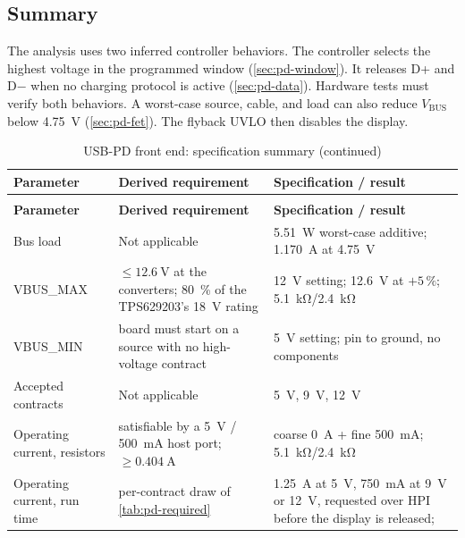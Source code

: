 \subsection{Summary}\label{sec:pd-summary}

The analysis uses two inferred controller behaviors. The controller selects the
highest voltage in the programmed window (\cref{sec:pd-window}). It releases D+
and D$-$ when no charging protocol is active (\cref{sec:pd-data}). Hardware
tests must verify both behaviors. A worst-case source, cable, and load can also
reduce $V_{\mathrm{BUS}}$ below \SI{4.75}{\volt} (\cref{sec:pd-fet}). The
flyback UVLO then disables the display.

{\footnotesize
\begin{longtable}{|p{}|p{}|p{}|}
\caption{USB-PD front end: specification summary}\label{tab:pd-summary}\\
\hline
\textbf{Parameter} & \textbf{Derived requirement} & \textbf{Specification / result} \\
\hline
\endfirsthead
\caption[]{USB-PD front end: specification summary (continued)}\\
\hline
\textbf{Parameter} & \textbf{Derived requirement} & \textbf{Specification / result} \\
\hline
\endhead
\hline
\endlastfoot
Bus load & Not applicable & \SI{5.51}{\watt} worst-case additive;
  \SI{1.170}{\ampere} at \SI{4.75}{\volt} \\
\hline
VBUS\_MAX & $\leq\SI{12.6}{\volt}$ at the converters; \SI{80}{\percent} of the
  TPS629203's \SI{18}{\volt} rating & \SI{12}{\volt} setting; \SI{12.6}{\volt}
  at $+5\,\%$; \SI{5.1}{\kilo\ohm}/\SI{2.4}{\kilo\ohm} \\
\hline
VBUS\_MIN & board must start on a source with no high-voltage contract &
  \SI{5}{\volt} setting; pin to ground, no components \\
\hline
Accepted contracts & Not applicable & \SI{5}{\volt}, \SI{9}{\volt}, \SI{12}{\volt} \\
\hline
Operating current, resistors & satisfiable by a \SI{5}{\volt} /
  \SI{500}{\milli\ampere} host port; $\geq\SI{0.404}{\ampere}$ &
  coarse \SI{0}{\ampere} + fine \SI{500}{\milli\ampere};
  \SI{5.1}{\kilo\ohm}/\SI{2.4}{\kilo\ohm} \\
\hline
Operating current, run time & per-contract draw of \cref{tab:pd-required} &
  \SI{1.25}{\ampere} at \SI{5}{\volt}, \SI{750}{\milli\ampere} at \SI{9}{\volt}
  or \SI{12}{\volt}, requested over HPI before the display is released;

\end{longtable}}
